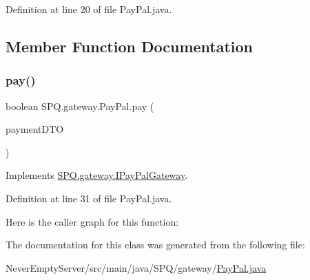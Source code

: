 Definition at line 20 of file Pay\+Pal.\+java.



\subsection{Member Function Documentation}
\mbox{\label{class_s_p_q_1_1gateway_1_1_pay_pal_a4f12e3d9fd7cc1ebf54e885df464f1d4}} 
\subsubsection{\texorpdfstring{pay()}{pay()}}
{\footnotesize\ttfamily boolean S\+P\+Q.\+gateway.\+Pay\+Pal.\+pay (\begin{DoxyParamCaption}\item[{\mbox{\hyperlink{class_s_p_q_1_1dto_1_1_payment_d_t_o}{Payment\+D\+TO}}}]{payment\+D\+TO }\end{DoxyParamCaption})}



Implements \mbox{\hyperlink{interface_s_p_q_1_1gateway_1_1_i_pay_pal_gateway_a064ef641b0db9c4a6d0de59089a108bf}{S\+P\+Q.\+gateway.\+I\+Pay\+Pal\+Gateway}}.



Definition at line 31 of file Pay\+Pal.\+java.

Here is the caller graph for this function\+:


The documentation for this class was generated from the following file\+:\begin{DoxyCompactItemize}
\item 
Never\+Empty\+Server/src/main/java/\+S\+P\+Q/gateway/\mbox{\hyperlink{_pay_pal_8java}{Pay\+Pal.\+java}}\end{DoxyCompactItemize}
